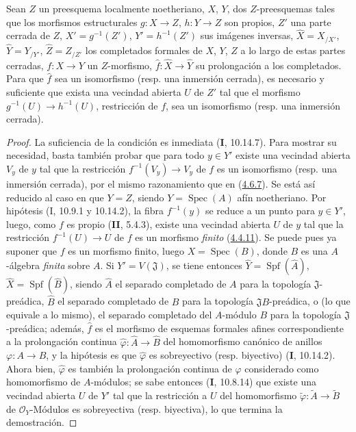 \begin{proposition}[4.6.8]
\label{III.4.6.8-fr}
Sean $Z$ un preesquema localmente noetheriano, $X$, $Y$, dos $Z$-preesquemas
tales que los morfismos estructurales $g:X\to Z$, $h:Y\to Z$ son propios,
$Z'$ una parte cerrada de $Z$, $X'=g^{-1}(Z')$, $Y'=h^{-1}(Z')$ sus imágenes
inversas,
$\widehat X=X_{/X'}$, $\widehat Y=Y_{/Y'}$, $\widehat Z=Z_{/Z'}$
los completados formales de $X$, $Y$, $Z$ a lo largo de estas partes cerradas,
$f:X\to Y$ un $Z$-morfismo, $\widehat f:\widehat X\to\widehat Y$ su
prolongación a los completados. Para que $\widehat f$ sea un isomorfismo (\textup{resp.}
una inmersión cerrada), es necesario y suficiente que exista una vecindad abierta
$U$ de $Z'$ tal que el morfismo $g^{-1}(U)\to h^{-1}(U)$, restricción de
$f$, sea un isomorfismo (\textup{resp.} una inmersión cerrada).
\end{proposition}

\begin{proof}
La suficiencia de la condición es inmediata (\textbf{I}, 10.14.7). Para mostrar su
necesidad, basta también probar que para todo $y\in Y'$ existe una
vecindad abierta $V_y$ de $y$ tal que la restricción
$f^{-1}(V_y)\to V_y$ de $f$ es un isomorfismo (resp. una inmersión
cerrada), por el mismo razonamiento que en
(\hyperref[III.4.6.7-fr]{4.6.7}). Se está así reducido al caso en que $Y=Z$,
siendo $Y=\operatorname{Spec}(A)$ afín noetheriano. Por hipótesis
(I, 10.9.1 y 10.14.2), la fibra $f^{-1}(y)$ se reduce a un punto para
$y\in Y'$, luego, como $f$ es propio (\textbf{II}, 5.4.3), existe una vecindad
abierta $U$ de $y$ tal que la restricción $f^{-1}(U)\to U$ de $f$ es un
morfismo \emph{finito} (\hyperref[III.4.4.11-fr]{4.4.11}). Se puede pues ya suponer
que $f$ es un morfismo finito, luego $X=\operatorname{Spec}(B)$, donde $B$ es
una $A$-álgebra \emph{finita} sobre $A$. Si $Y'=V(\mathfrak J)$, se tiene entonces
$\widehat Y=\operatorname{Spf}(\widehat A)$, $\widehat X=\operatorname{Spf}(\widehat B)$,
siendo $\widehat A$ el separado completado de $A$ para la topología
$\mathfrak J$-preádica, $\widehat B$ el separado completado de $B$ para la
topología $\mathfrak JB$-preádica, o (lo que equivale a lo mismo), el separado
completado del $A$-módulo $B$ para la topología $\mathfrak J$-preádica;
además, $\widehat f$ es el morfismo de esquemas formales afines correspondiente
a la prolongación continua $\widehat\varphi:\widehat A\to\widehat B$ del
homomorfismo canónico de anillos $\varphi:A\to B$, y la hipótesis es que
$\widehat\varphi$ es sobreyectivo (resp. biyectivo) (\textbf{I}, 10.14.2). Ahora bien,
$\widehat\varphi$ es también la prolongación continua de $\varphi$ considerado
como homomorfismo de $A$-módulos; se sabe entonces (\textbf{I}, 10.8.14) que existe
una vecindad abierta $U$ de $Y'$ tal que la restricción a $U$ del
homomorfismo $\widetilde\varphi:\widetilde A\to\widetilde B$ de
$\mathcal O_Y$-Módulos es sobreyectiva (resp. biyectiva), lo que termina la
demostración.
\end{proof}

